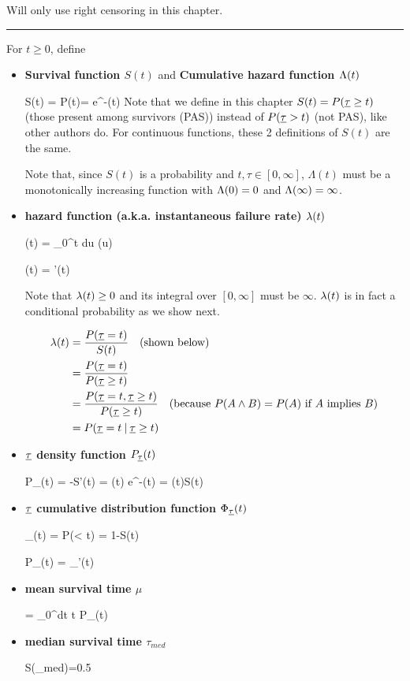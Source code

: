 Will only use right censoring in this chapter.
\hrule
For $t\geq 0$, define
\begin{itemize}
\item {\bf Survival function $S(t)$}
and {\bf Cumulative hazard function $\Lambda(t)$}

\beq
S(t) = P(\rvtau \geq t)= e^{-\Lam(t)}
\eeq
Note that we define in this chapter
 $S(t) = P({\underline{\tau}}\geq t)$ (those present among survivors (PAS))
instead of $P({\underline{\tau}} > t)$ (not PAS), like other authors do. For
continuous functions,
these 2 definitions of $S(t)$
are the same.

Note that,
since $S(t)$
is a probability and $t, \tau \in [0, \infty]$,
$\Lambda(t)$ must be a monotonically increasing function with
$\Lambda(0)=0$ and $\Lambda(\infty) = \infty$.

\item {\bf hazard function
(a.k.a.  instantaneous failure rate) $\lambda(t)$}

\beq
\Lam(t) = \int_0^t  du\; \lam(u)
\eeq

\beq
\lam(t) = \Lam'(t)
\eeq

Note that $\lambda(t)\geq 0$
and its integral over $[0,\infty]$
must be $\infty$.
$\lambda(t)$ is in fact a conditional probability
as we show next.

\begin{align}
\lambda(t) &=
\frac{P({\underline{\tau}}=t)}{S(t)} \quad \text{(shown below)}
\\
&=
\frac{P({\underline{\tau}}=t)}{P({\underline{\tau}}\geq t)}
\\
&=
\frac{P({\underline{\tau}}=t, {\underline{\tau}}\geq t)}{P({\underline{\tau}}\geq t)}
\quad\text{(because $P(A \wedge B) = P(A)$ if $A$ implies $B$)}
\\
&=
P({\underline{\tau}}=t{\:\mathbf{|}\:} {\underline{\tau}}\geq t)
\end{align}


\item {\bf ${\underline{\tau}}$ density function $P_{\underline{\tau}}(t)$}

\beq
P_\rvtau(t) = -S'(t) = \lam(t) e^{-\Lam(t)} =
\lam(t)S(t)
\eeq

\item {\bf ${\underline{\tau}}$ cumulative distribution function
$\Phi_{\underline{\tau}}(t)$}

\beq
\Phi_\rvtau(t) = P(\rvtau< t) = 1-S(t)
\eeq

\beq
P_\rvtau(t) = \Phi_\rvtau'(t)
\eeq

\item {\bf mean survival time $\mu$}

\beq
\mu= \int_0^\infty dt\; t P_\rvtau(t)
\eeq

\item {\bf median survival time $\tau_{med}$}

\beq
S(\tau_{med})=0.5
\eeq

\end{itemize}

